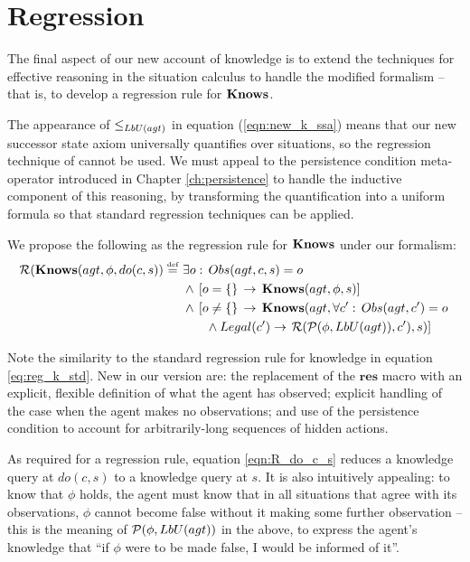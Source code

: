 \section{Regression\label{sec:Knowledge:Regression}}

The final aspect of our new account of knowledge is to extend the
techniques for effective reasoning in the situation calculus to handle
the modified formalism -- that is, to develop a regression rule for
$\mathbf{Knows}$.

The appearance of $\leq_{LbU(agt)}$ in equation (\ref{eqn:new_k_ssa})
means that our new successor state axiom universally quantifies over
situations, so the regression technique of \citep{scherl03sc_knowledge}
cannot be used. We must appeal to the persistence condition meta-operator
introduced in Chapter \ref{ch:persistence} to handle the
inductive component of this reasoning, by transforming the quantification
into a uniform formula so that standard regression techniques can
be applied.

We propose the following as the regression rule for $\mathbf{Knows}$ under
our formalism:\begin{align}
\mathcal{R}(\mathbf{Knows}(agt,\phi,do(c,s))\stackrel{\mbox{\tiny def}}{=}\,\, & \exists o:\, Obs(agt,c,s)=o\nonumber \\
 & \wedge\,\left[o=\{\}\,\rightarrow\,\mathbf{Knows}(agt,\phi,s)\right]\nonumber \\
 & \wedge\,\left[o\neq\{\}\,\rightarrow\,\mathbf{Knows}(agt,\forall c':\, Obs(agt,c')=o\right.\nonumber \\
 & \,\,\,\,\,\,\,\,\,\,\,\wedge Legal(c')\rightarrow\left.\mathcal{R}(\mathcal{P}(\phi,LbU(agt)),c'),s)\right]\label{eqn:R_do_c_s}\end{align}


Note the similarity to the standard regression rule for knowledge
in equation \eqref{eq:reg_k_std}. New in our version are: the replacement
of the $\mathbf{res}$ macro with an explicit, flexible definition
of what the agent has observed; explicit handling of the case when
the agent makes no observations; and use of the persistence condition
to account for arbitrarily-long sequences of hidden actions.

As required for a regression rule, equation \eqref{eqn:R_do_c_s}
reduces a knowledge query at $do(c,s)$ to a knowledge query at $s$.
It is also intuitively appealing: to know that $\phi$ holds, the
agent must know that in all situations that agree with its observations,
$\phi$ cannot become false without it making some further observation
-- this is the meaning of $\mathcal{P}(\phi,LbU(agt))$ in the above, to
express the agent's knowledge that {}``if $\phi$ were to be made
false, I would be informed of it''.

